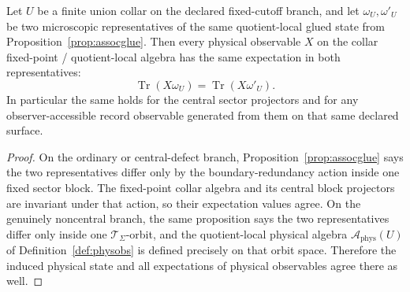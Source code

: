 \begin{corollary}\label{cor:obsglue}
Let \(U\) be a finite union collar on the declared fixed-cutoff branch, and let
\(\omega_U,\omega'_U\) be two microscopic representatives of the same quotient-local glued state
from Proposition~\ref{prop:assocglue}. Then every physical observable \(X\) on the collar
fixed-point / quotient-local algebra has the same expectation in both representatives:
\[
\operatorname{Tr}(X\omega_U)=\operatorname{Tr}(X\omega'_U).
\]
In particular the same holds for the central sector projectors and for any observer-accessible
record observable generated from them on that same declared surface.
\end{corollary}

\begin{proof}
On the ordinary or central-defect branch, Proposition~\ref{prop:assocglue} says the two
representatives differ only by the boundary-redundancy action inside one fixed sector block. The
fixed-point collar algebra and its central block projectors are invariant under that action, so
their expectation values agree. On the genuinely noncentral branch, the same proposition says the
two representatives differ only inside one \(\mathcal T_\Sigma\)-orbit, and the quotient-local
physical algebra \(\mathcal A_{\mathrm{phys}}(U)\) of Definition~\ref{def:physobs} is defined
precisely on that orbit space. Therefore the induced physical state and all expectations of
physical observables agree there as well.
\end{proof}
